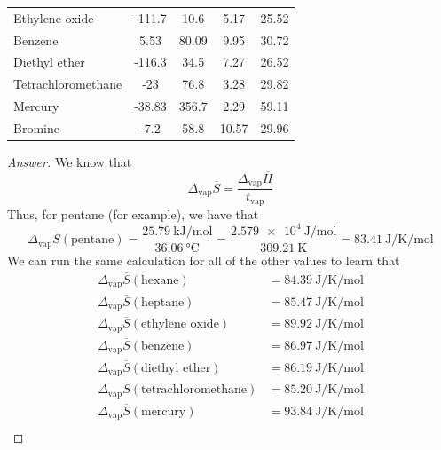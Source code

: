 \documentclass[../psets.tex]{subfiles}
\begin{document}
\begin{enumerate}
\begin{center}
\begin{tabular}{
            l
            c
            S[table-format=3.2]
            S[table-format=2.2]
            S[table-format=2.2]
        }
            Ethylene oxide     & -111.7 & 10.6  & 5.17  & 25.52\\
            Benzene            & 5.53   & 80.09 & 9.95  & 30.72\\
            Diethyl ether      & -116.3 & 34.5  & 7.27  & 26.52\\
            Tetrachloromethane & -23    & 76.8  & 3.28  & 29.82\\
            Mercury            & -38.83 & 356.7 & 2.29  & 59.11\\
            Bromine            & -7.2   & 58.8  & 10.57 & 29.96\\
            \bottomrule
        \end{tabular}
    \end{center}
    \begin{proof}[Answer]
        We know that
        \begin{equation*}
            \Delta_\text{vap}\overline{S} = \frac{\Delta_\text{vap}\overline{H}}{t_\text{vap}}
        \end{equation*}
        Thus, for pentane (for example), we have that
        \begin{equation*}
            \Delta_\text{vap}\overline{S}(\text{pentane}) = \frac{\SI{25.79}{\kilo\joule\per\mole}}{\SI{36.06}{\celsius}}
            = \frac{\SI{2.579e4}{\joule\per\mole}}{\SI{309.21}{\kelvin}}
            = \SI{83.41}{\joule\per\kelvin\per\mole}
        \end{equation*}
        We can run the same calculation for all of the other values to learn that
        \begin{align*}
            \Delta_\text{vap}\overline{S}(\text{hexane}) &= \SI{84.39}{\joule\per\kelvin\per\mole}\\
            \Delta_\text{vap}\overline{S}(\text{heptane}) &= \SI{85.47}{\joule\per\kelvin\per\mole}\\
            \Delta_\text{vap}\overline{S}(\text{ethylene oxide}) &= \SI{89.92}{\joule\per\kelvin\per\mole}\\
            \Delta_\text{vap}\overline{S}(\text{benzene}) &= \SI{86.97}{\joule\per\kelvin\per\mole}\\
            \Delta_\text{vap}\overline{S}(\text{diethyl ether}) &= \SI{86.19}{\joule\per\kelvin\per\mole}\\
            \Delta_\text{vap}\overline{S}(\text{tetrachloromethane}) &= \SI{85.20}{\joule\per\kelvin\per\mole}\\
            \Delta_\text{vap}\overline{S}(\text{mercury}) &= \SI{93.84}{\joule\per\kelvin\per\mole}\\

\end{align*}
\end{proof}
\end{enumerate}
\end{document}
